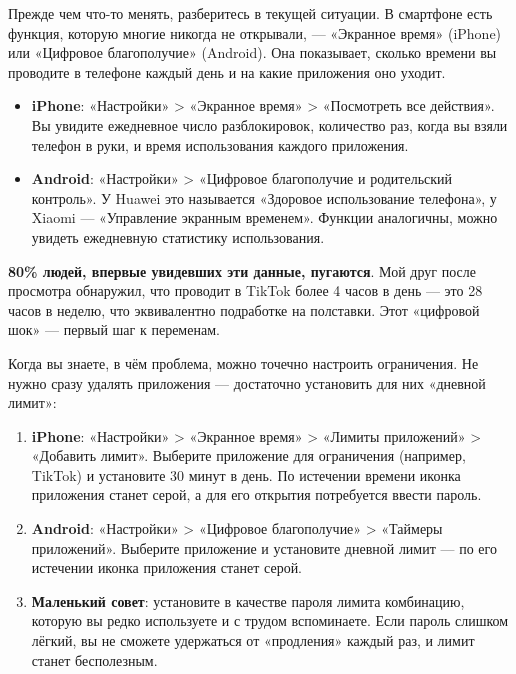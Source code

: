 


Прежде чем что-то менять, разберитесь в текущей ситуации. В смартфоне есть функция, которую многие никогда не открывали, — «Экранное время» (iPhone) или «Цифровое благополучие» (Android). Она показывает, сколько времени вы проводите в телефоне каждый день и на какие приложения оно уходит.

\begin{itemize}
  \item \textbf{iPhone}: «Настройки» > «Экранное время» > «Посмотреть все действия». Вы увидите ежедневное число разблокировок, количество раз, когда вы взяли телефон в руки, и время использования каждого приложения.
  \item \textbf{Android}: «Настройки» > «Цифровое благополучие и родительский контроль». У Huawei это называется «Здоровое использование телефона», у Xiaomi — «Управление экранным временем». Функции аналогичны, можно увидеть ежедневную статистику использования.
\end{itemize}

\textbf{80\% людей, впервые увидевших эти данные, пугаются}. Мой друг после просмотра обнаружил, что проводит в TikTok более 4 часов в день — это 28 часов в неделю, что эквивалентно подработке на полставки. Этот «цифровой шок» — первый шаг к переменам.


Когда вы знаете, в чём проблема, можно точечно настроить ограничения. Не нужно сразу удалять приложения — достаточно установить для них «дневной лимит»:

\begin{enumerate}
  \item \textbf{iPhone}: «Настройки» > «Экранное время» > «Лимиты приложений» > «Добавить лимит». Выберите приложение для ограничения (например, TikTok) и установите 30 минут в день. По истечении времени иконка приложения станет серой, а для его открытия потребуется ввести пароль.
  \item \textbf{Android}: «Настройки» > «Цифровое благополучие» > «Таймеры приложений». Выберите приложение и установите дневной лимит — по его истечении иконка приложения станет серой.
  \item \textbf{Маленький совет}: установите в качестве пароля лимита комбинацию, которую вы редко используете и с трудом вспоминаете. Если пароль слишком лёгкий, вы не сможете удержаться от «продления» каждый раз, и лимит станет бесполезным.
\end{enumerate}

